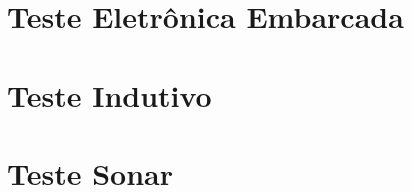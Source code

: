 \documentclass[a4paper,11pt,oneside,openany,brazilian, version=last,draft=false,]{article}
\begin{document}











%




\tableofcontents
\listoffigures
\section{Teste Eletrônica Embarcada}







\section{Teste Indutivo}









\section{Teste Sonar}









%












\end{document}
